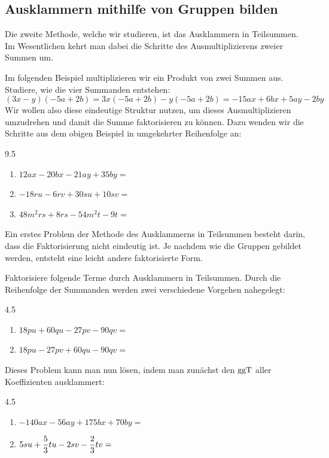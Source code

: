 \documentclass[11pt,oneside]{article}
\begin{document}
\subsection{Ausklammern mithilfe von Gruppen bilden}
    Die zweite Methode, welche wir studieren, ist das \glqq Ausklammern in Teilsummen\grqq. Im Wesentlichen kehrt man dabei die Schritte des Ausmultiplizierens zweier Summen um.
    \begin{beispiel}
        Im folgenden Beispiel multiplizieren wir ein Produkt von zwei Summen aus. Studiere, wie die vier Summanden entstehen:
        \[(3x-y)(-5a+2b) = 3x(-5a+2b) -y(-5a+2b) = -15ax + 6bx + 5ay - 2by\]
        Wir wollen also diese eindeutige Struktur nutzen, um dieses Ausmultiplizieren umzudrehen und damit die Summe faktorisieren zu können. Dazu wenden wir die Schritte aus dem obigen Beispiel in umgekehrter Reihenfolge an:
        \begin{gridspace}{9.5}
        	\begin{enumerate}[label=\alph*)]
        		\item $12ax - 20bx -21ay + 35by = $\\[10mm]
        		\item $-18ru - 6rv + 30su + 10sv =$\\[10mm]
        		\item $48m^{2}rs + 8rs - 54m^{2}t - 9t = $\\
        	\end{enumerate}
        \end{gridspace}
    \end{beispiel}
    Ein erstes Problem der Methode des Ausklammerns in Teilsummen besteht darin, dass die Faktorisierung nicht eindeutig ist. Je nachdem wie die Gruppen gebildet werden, entsteht eine leicht andere faktorisierte Form.
    \begin{beispiel}
        Faktorisiere folgende Terme durch Ausklammern in Teilsummen. Durch die Reihenfolge der Summanden werden zwei verschiedene Vorgehen nahegelegt:
        \begin{gridspace}{4.5}
        	\begin{enumerate}[label=\alph*)]
        		\item $18pu+60qu-27pv-90qv=$\\
        		\item $18pu-27pv+60qu-90qv =$
        	\end{enumerate}
        \end{gridspace}
        Dieses Problem kann man nun lösen, indem man zunächst den $\operatorname{ggT}$ aller Koeffizienten ausklammert:
        \begin{gridspace}{4.5}
        	\begin{enumerate}[label=\alph*)]
        		\item $-140ax-56ay+175bx+70by=$\\
        		\item $\displaystyle 5su+\frac{5}{3}tu-2sv-\frac{2}{3}tv=$
        	\end{enumerate}
        \end{gridspace}
    \end{beispiel}
\end{document}
